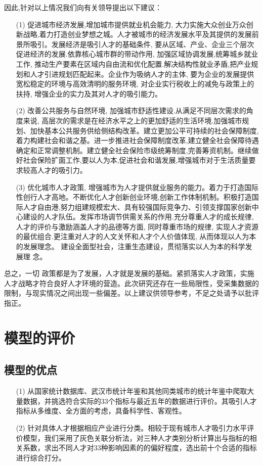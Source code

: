\documentclass{whutmod}
\begin{document}
	因此,针对以上情况我们向有关领导提出以下建议：
	\begin{itemize}
		\item [(1)] 促进城市经济发展,增加城市提供就业机会能力, 大力实施大众创业万众创新战略,着力打造创业梦想之城。人才被城市的经济发展水平及其提供的发展前景所吸引。发展经济是吸引人才的基础条件, 要从区域、产业、企业三个层次促进经济的发展.依靠核心城市群的带动作用, 加强区域协调发展,统筹城乡就业工作, 推动生产要素在区域内自由流和优化配置.解决结构性就业矛盾,把产业规划和人才引进规划匹配起来。企业作为吸纳人才的主体, 要为企业的发展提供宽松稳定的环境与高效清明的服务环境, 对企业实行税收上的减免与政策上的扶持, 增强企业的实力及其对人才的吸引能力。
		\item [(2)]改善公共服务与自然环境, 加强城市舒适性建设.从满足不同层次需求的角度来说, 高层次的需求是在经济水平之上的更加舒适的生活环境.加强城市规划、加快基本公共服务供给侧结构改革。建立更加公平可持续的社会保障制度,着力构建社会和谐之基。进一步推进社会保障制度改革,建立健全社会保障待遇确定和正常调整机制。建立健全社会保险市级统筹制度,完善筹资机制。继续做好社会保险扩面工作,要以人为本,促进社会和谐发展,增强城市对于生活质量要求较高人才的吸引力。
		\item [(3)]优化城市人才政策, 增强城市为人才提供就业服务的能力。着力于打造国际性创行人才高地。不断优化人才创新创业环境,创新工作体制机制。积极打造国际人才自由港,努力组建规模宏大、具有较强国际竞争力、引领支撑国家创新中心建设的人才队伍。发挥市场调节供需关系的作用.充分尊重人才的成长规律, 人才的评价与激励涵盖人才的品德等方面, 同时尊重市场的规律, 实现人才资源的最优组合.更注重对人才的人文关怀和人才个人价值体现, 从而体现以人为本的发展理念。
		建设全面型社会，注重生态建设，贯彻落实以人为本的科学发展理
		念。
	\end{itemize}


	总之，一切
	政策都是为了发展，人才就是发展的基础。紧抓落实人才政策，实施人才战略才符合良好人才环境的营造。此次研究还存在一些局限性，受采集数据的限制，与现实情况之间出现一些偏差。以上建议供领导参考，不足之处请予以批评指正。



	\section{模型的评价}
	\subsection{模型的优点}
	\begin{itemize}
		\item [(1)] 从国家统计数据库、武汉市统计年鉴和其他同类城市的统计年鉴中爬取大量数据，并挑选符合实际的33个指标与最近五年的数据进行评价。其吸引人才指标从多维度、全方面的考虑，具备科学性、客观性。
		\item [(2)]针对具体人才根据相应产业进行分类。相较于现有城市人才吸引力水平评价模型，我们采用了灰色关联分析法，对三种人才类别分析计算出与指标的相关系数，求出不同人才对33种影响因素的的偏好程度，选出前十个合适的指标进行综合打分。
	\end{itemize}
\end{document}
